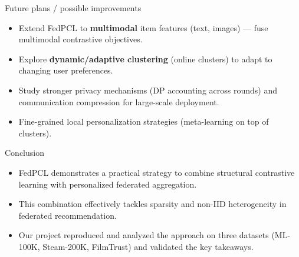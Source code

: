 \documentclass{beamer}
\begin{document}

\begin{frame}{Future plans / possible improvements}
  \begin{itemize}
    \item Extend FedPCL to \textbf{multimodal} item features (text, images) — fuse multimodal contrastive objectives.
    \item Explore \textbf{dynamic/adaptive clustering} (online clusters) to adapt to changing user preferences.
    \item Study stronger privacy mechanisms (DP accounting across rounds) and communication compression for large-scale deployment.
    \item Fine-grained local personalization strategies (meta-learning on top of clusters).
  \end{itemize}
\end{frame}

\begin{frame}{Conclusion}
  \begin{itemize}
    \item FedPCL demonstrates a practical strategy to combine structural contrastive learning with personalized federated aggregation.
    \item This combination effectively tackles sparsity and non-IID heterogeneity in federated recommendation.
    \item Our project reproduced and analyzed the approach on three datasets (ML-100K, Steam-200K, FilmTrust) and validated the key takeaways.
  \end{itemize}
\end{frame}
\end{document}
